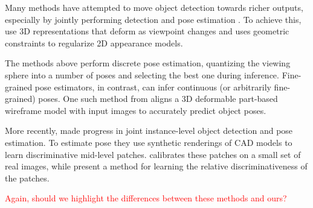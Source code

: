 \documentclass[10pt,twocolumn,letterpaper]{article}
\begin{document}
Many methods have attempted to move object detection towards richer outputs, especially by jointly performing detection and pose estimation \cite{Pepik12, Xiang12, Fidler12, Xiang14, Hejrati14, Aubry14, Lim14}. To achieve this, \cite{Xiang12, Hejrati14, Fidler12} use 3D representations that deform as viewpoint changes and \cite{Pepik12} uses geometric constraints to regularize 2D appearance models.

The methods above perform discrete pose estimation, quantizing the viewing sphere into a number of poses and selecting the best one during inference. Fine-grained pose estimators, in contrast, can infer continuous (or arbitrarily fine-grained) poses. One such method from \cite{Zia13} aligns a 3D deformable part-based wireframe model with input images to accurately predict object poses.

More recently, \cite{Aubry14, Lim14} made progress in joint instance-level object detection and pose estimation. To estimate pose they use synthetic renderings of CAD models to learn discriminative mid-level patches. \cite{Aubry14} calibrates these patches on a small set of real images, while \cite{Lim14} present a method for learning the relative discriminativeness of the patches.

\textcolor{red}{Again, should we highlight the differences between these methods and ours?}

 
  
\end{document}
